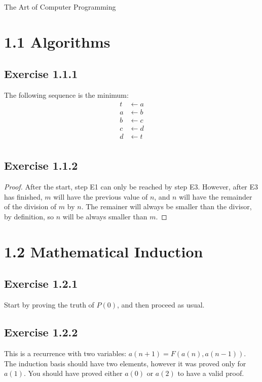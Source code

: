 \documentclass[10pt]{book}
\begin{document}
The Art of Computer Programming

\chapter{1.1 Algorithms}

\section{Exercise 1.1.1}

The following sequence is the minimum:
\begin{align*}
t&\leftarrow a\\
a&\leftarrow b\\
b&\leftarrow c\\
c&\leftarrow d\\
d&\leftarrow t\\
\end{align*}

\section{Exercise 1.1.2}

\begin{proof}
After the start, step E1 can only be reached by step E3. However, after E3 has 
finished, $m$ will have the previous value of $n$, and $n$ will have the
remainder of the division of $m$ by $n$. The remainer will always be smaller
than the divisor, by definition, so $n$ will be always smaller than $m$. 
\qedhere
\end{proof}

\chapter{1.2 Mathematical Induction}

\section{Exercise 1.2.1}

Start by proving the truth of $P(0)$, and then proceed as usual.

\section{Exercise 1.2.2}

This is a recurrence with two variables: $a(n+1)=F(a(n),a(n-1))$. The 
induction basis should have two elements, however it was proved only
for $a(1)$. You should have proved either $a(0)$ or $a(2)$ to have a valid 
proof.
\end{document}
